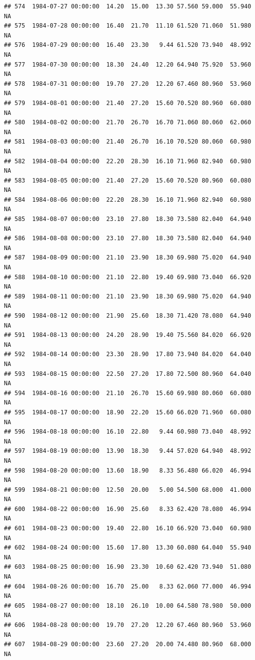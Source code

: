 \documentclass{article}\usepackage{graphicx, color}
\makeatletter
\newenvironment{kframe}{%
 \def\at@end@of@kframe{}%
 \ifinner\ifhmode%
  \def\at@end@of@kframe{\end{minipage}}%
  \begin{minipage}{\columnwidth}%
 \fi\fi%
 \def\FrameCommand##1{\hskip\@totalleftmargin \hskip-\fboxsep
 \colorbox{shadecolor}{##1}\hskip-\fboxsep
     \hskip-\linewidth \hskip-\@totalleftmargin \hskip\columnwidth}%
 \MakeFramed {\advance\hsize-\width
   \@totalleftmargin\z@ \linewidth\hsize
   \@setminipage}}%
 {\par\unskip\endMakeFramed%
 \at@end@of@kframe}
\newenvironment{knitrout}{}{} %
\makeatother
\begin{document}
\begin{knitrout}
\begin{kframe}
\begin{verbatim}
## 574  1984-07-27 00:00:00  14.20  15.00  13.30 57.560 59.000  55.940     NA
## 575  1984-07-28 00:00:00  16.40  21.70  11.10 61.520 71.060  51.980     NA
## 576  1984-07-29 00:00:00  16.40  23.30   9.44 61.520 73.940  48.992     NA
## 577  1984-07-30 00:00:00  18.30  24.40  12.20 64.940 75.920  53.960     NA
## 578  1984-07-31 00:00:00  19.70  27.20  12.20 67.460 80.960  53.960     NA
## 579  1984-08-01 00:00:00  21.40  27.20  15.60 70.520 80.960  60.080     NA
## 580  1984-08-02 00:00:00  21.70  26.70  16.70 71.060 80.060  62.060     NA
## 581  1984-08-03 00:00:00  21.40  26.70  16.10 70.520 80.060  60.980     NA
## 582  1984-08-04 00:00:00  22.20  28.30  16.10 71.960 82.940  60.980     NA
## 583  1984-08-05 00:00:00  21.40  27.20  15.60 70.520 80.960  60.080     NA
## 584  1984-08-06 00:00:00  22.20  28.30  16.10 71.960 82.940  60.980     NA
## 585  1984-08-07 00:00:00  23.10  27.80  18.30 73.580 82.040  64.940     NA
## 586  1984-08-08 00:00:00  23.10  27.80  18.30 73.580 82.040  64.940     NA
## 587  1984-08-09 00:00:00  21.10  23.90  18.30 69.980 75.020  64.940     NA
## 588  1984-08-10 00:00:00  21.10  22.80  19.40 69.980 73.040  66.920     NA
## 589  1984-08-11 00:00:00  21.10  23.90  18.30 69.980 75.020  64.940     NA
## 590  1984-08-12 00:00:00  21.90  25.60  18.30 71.420 78.080  64.940     NA
## 591  1984-08-13 00:00:00  24.20  28.90  19.40 75.560 84.020  66.920     NA
## 592  1984-08-14 00:00:00  23.30  28.90  17.80 73.940 84.020  64.040     NA
## 593  1984-08-15 00:00:00  22.50  27.20  17.80 72.500 80.960  64.040     NA
## 594  1984-08-16 00:00:00  21.10  26.70  15.60 69.980 80.060  60.080     NA
## 595  1984-08-17 00:00:00  18.90  22.20  15.60 66.020 71.960  60.080     NA
## 596  1984-08-18 00:00:00  16.10  22.80   9.44 60.980 73.040  48.992     NA
## 597  1984-08-19 00:00:00  13.90  18.30   9.44 57.020 64.940  48.992     NA
## 598  1984-08-20 00:00:00  13.60  18.90   8.33 56.480 66.020  46.994     NA
## 599  1984-08-21 00:00:00  12.50  20.00   5.00 54.500 68.000  41.000     NA
## 600  1984-08-22 00:00:00  16.90  25.60   8.33 62.420 78.080  46.994     NA
## 601  1984-08-23 00:00:00  19.40  22.80  16.10 66.920 73.040  60.980     NA
## 602  1984-08-24 00:00:00  15.60  17.80  13.30 60.080 64.040  55.940     NA
## 603  1984-08-25 00:00:00  16.90  23.30  10.60 62.420 73.940  51.080     NA
## 604  1984-08-26 00:00:00  16.70  25.00   8.33 62.060 77.000  46.994     NA
## 605  1984-08-27 00:00:00  18.10  26.10  10.00 64.580 78.980  50.000     NA
## 606  1984-08-28 00:00:00  19.70  27.20  12.20 67.460 80.960  53.960     NA
## 607  1984-08-29 00:00:00  23.60  27.20  20.00 74.480 80.960  68.000     NA

\end{verbatim}
\end{kframe}
\end{knitrout}
\end{document}
